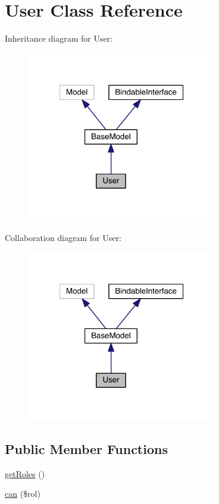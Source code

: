 \hypertarget{class_security_1_1_user}{\section{User Class Reference}
\label{class_security_1_1_user}
}


Inheritance diagram for User\-:
\nopagebreak
\begin{figure}[H]
\begin{center}
\leavevmode
\includegraphics[width=234pt]{class_security_1_1_user__inherit__graph}
\end{center}
\end{figure}


Collaboration diagram for User\-:
\nopagebreak
\begin{figure}[H]
\begin{center}
\leavevmode
\includegraphics[width=234pt]{class_security_1_1_user__coll__graph}
\end{center}
\end{figure}
\subsection*{Public Member Functions}
\begin{DoxyCompactItemize}
\item 
\hyperlink{class_security_1_1_user_aa676cae5ee8d7fb6862a8724adc2660d}{get\-Roles} ()
\item 
\hyperlink{class_security_1_1_user_a50af1247d47987b261ec04c12181184b}{can} (\$rol)
\end{DoxyCompactItemize}
